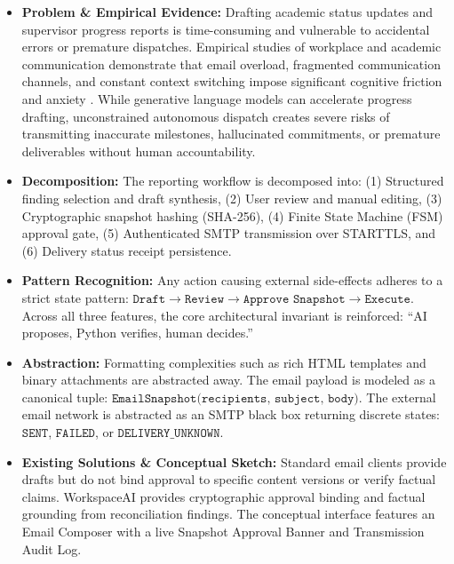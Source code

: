\begin{itemize}[leftmargin=*,itemsep=3pt]

    \item \textbf{Problem \& Empirical Evidence:} Drafting academic status updates and supervisor progress reports is time-consuming and vulnerable to accidental errors or premature dispatches. Empirical studies of workplace and academic communication demonstrate that email overload, fragmented communication channels, and constant context switching impose significant cognitive friction and anxiety \cite{mark2016email}. While generative language models can accelerate progress drafting, unconstrained autonomous dispatch creates severe risks of transmitting inaccurate milestones, hallucinated commitments, or premature deliverables without human accountability.

    \item \textbf{Decomposition:} The reporting workflow is decomposed into: (1) Structured finding selection and draft synthesis, (2) User review and manual editing, (3) Cryptographic snapshot hashing (SHA-256), (4) Finite State Machine (FSM) approval gate, (5) Authenticated SMTP transmission over STARTTLS, and (6) Delivery status receipt persistence.

    \item \textbf{Pattern Recognition:} Any action causing external side-effects adheres to a strict state pattern: $\texttt{Draft} \rightarrow \texttt{Review} \rightarrow \texttt{Approve Snapshot} \rightarrow \texttt{Execute}$. Across all three features, the core architectural invariant is reinforced: ``AI proposes, Python verifies, human decides.''

    \item \textbf{Abstraction:} Formatting complexities such as rich HTML templates and binary attachments are abstracted away. The email payload is modeled as a canonical tuple: $\texttt{EmailSnapshot(recipients, subject, body)}$. The external email network is abstracted as an SMTP black box returning discrete states: $\texttt{SENT}$, $\texttt{FAILED}$, or $\texttt{DELIVERY\_UNKNOWN}$.

    \item \textbf{Existing Solutions \& Conceptual Sketch:} Standard email clients provide drafts but do not bind approval to specific content versions or verify factual claims. WorkspaceAI provides cryptographic approval binding and factual grounding from reconciliation findings. The conceptual interface features an Email Composer with a live Snapshot Approval Banner and Transmission Audit Log.

\end{itemize}



